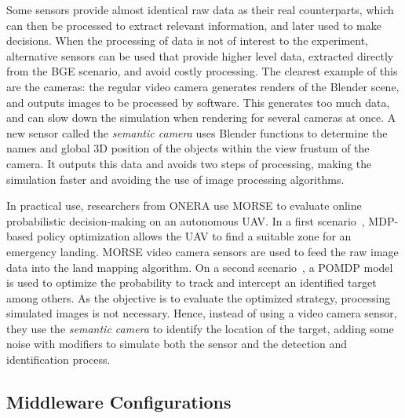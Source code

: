 \documentclass{llncs}
\newcommand{\serge}[1]{\nb{Serge}{blue}{#1}}
\newcommand{\gilberto}[1]{\nb{Gilberto}{red}{#1}}
\begin{document}
Some sensors provide almost identical raw data as their real counterparts,
which can then be processed to extract relevant information,
and later used to make decisions. When the processing of data is not of
interest to the experiment, alternative sensors can be used that provide
higher level data, extracted directly from the BGE scenario, and avoid costly
processing.
The clearest example of this are the cameras: the regular video camera
generates renders of the Blender scene, and outputs images to be processed by
software. This generates too much data, and can slow down the simulation when
rendering for several cameras at once. A new sensor called the \emph{semantic
camera} uses Blender functions to determine the names and global 3D position of
the objects within the view frustum of the camera. It outputs this data and
avoids two steps of processing, making the simulation faster and
avoiding the use of image processing algorithms.

In practical use, researchers from ONERA use MORSE to evaluate online probabilistic
decision-making on an autonomous UAV. In a first scenario~\cite{teichteil2011},
MDP-based policy optimization allows the UAV to find a suitable zone for an
emergency landing. MORSE video camera sensors are used to feed the raw image data
into the land mapping algorithm.
On a second scenario~\cite{carvalho2012}, a POMDP model is used to optimize the
probability to track and intercept an identified target among others. As the
objective is to evaluate the optimized strategy, processing
simulated images is not necessary. Hence, instead of using a video camera
sensor, they use the \emph{semantic camera} to identify the location of the target,
adding some noise with modifiers to simulate both the sensor and the detection
and identification process.

%


\subsection{Middleware Configurations}
\label{section:middlewares}
\end{document}
